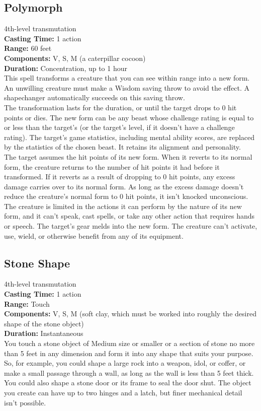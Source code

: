 \documentclass[11pt, A4paper, english]{article}
\begin{document}
		\subsection{Polymorph}
4th-level transmutation \\
\textbf{Casting Time:} 1 action \\
\textbf{Range:} 60 feet \\
\textbf{Components:} V, S, M (a caterpillar cocoon) \\
\textbf{Duration:} Concentration, up to 1 hour \\
This spell transforms a creature that you can see within range into a new form. An unwilling creature must make a Wisdom saving throw to avoid the effect. A shapechanger automatically succeeds on this saving throw. \\
The transformation lasts for the duration, or until the target drops to 0 hit points or dies. The new form can be any beast whose challenge rating is equal to or less than the target’s (or the target’s level, if it doesn't have a challenge rating). The target’s game statistics, including mental ability scores, are replaced by the statistics of the chosen beast. It retains its alignment and personality. \\
The target assumes the hit points of its new form. When it reverts to its normal form, the creature returns to the number of hit points it had before it transformed. If it reverts as a result of dropping to 0 hit points, any excess damage carries over to its normal form. As long as the excess damage doesn’t reduce the creature’s normal form to 0 hit points, it isn’t knocked unconscious. \\
The creature is limited in the actions it can perform by the nature of its new form, and it can’t speak, cast spells, or take any other action that requires hands or speech. The target’s gear melds into the new form. The creature can’t activate, use, wield, or otherwise benefit from any of its equipment.

		\subsection{Stone Shape}
4th-level transmutation \\
\textbf{Casting Time:} 1 action \\
\textbf{Range:} Touch \\
\textbf{Components:} V, S, M (soft clay, which must be worked into roughly the desired shape of the stone object) \\
\textbf{Duration:} Instantaneous \\
You touch a stone object of Medium size or smaller or a section of stone no more than 5 feet in any dimension and form it into any shape that suits your purpose. So, for example, you could shape a large rock into a weapon, idol, or coffer, or make a small passage through a wall, as long as the wall is less than 5 feet thick. You could also shape a stone door or its frame to seal the door shut. The object you create can have up to two hinges and a latch, but finer mechanical detail isn’t possible.
\end{document}
